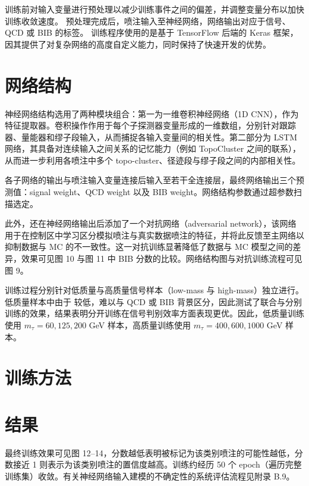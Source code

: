 训练前对输入变量进行预处理以减少训练事件之间的偏差，并调整变量分布以加快训练收敛速度。
预处理完成后，喷注输入至神经网络，网络输出对应于信号、QCD 或 BIB 的标签。
训练程序使用的是基于 TensorFlow 后端的 Keras 框架，因其提供了对复杂网络的高度自定义能力，同时保持了快速开发的优势。


\section{网络结构}
神经网络结构选用了两种模块组合：第一为一维卷积神经网络（1D CNN），作为特征提取器。卷积操作作用于每个子探测器变量形成的一维数组，分别针对跟踪器、量能器和缪子段输入，从而捕捉各输入变量间的相关性。第二部分为 LSTM 网络，其具备对连续输入之间关系的记忆能力（例如 TopoCluster 之间的联系），从而进一步利用各喷注中多个 topo-cluster、径迹段与缪子段之间的内部相关性。

各子网络的输出与喷注输入变量连接后输入至若干全连接层，最终网络输出三个预测值：signal weight、QCD weight 以及 BIB weight。网络结构参数通过超参数扫描选定。

此外，还在神经网络输出后添加了一个对抗网络（adversarial network），该网络用于在控制区中学习区分模拟喷注与真实数据喷注的特征，并将此反馈至主网络以抑制数据与 MC 的不一致性。这一对抗训练显著降低了数据与 MC 模型之间的差异，效果可见图 10 与图 11 中 BIB 分数的比较。网络结构图与对抗训练流程可见图 9。

训练过程分别针对低质量与高质量信号样本（low-mass 与 high-mass）独立进行。低质量样本中由于 \pt 较低，难以与 QCD 或 BIB 背景区分，因此测试了联合与分别训练的效果，结果表明分开训练在信号判别效率方面表现更优。因此，低质量训练使用 $m_\tau = 60, 125, 200$ GeV 样本，高质量训练使用 $m_\tau = 400, 600, 1000$ GeV 样本。


\section{训练方法}


\section{结果}
最终训练效果可见图 12--14，分数越低表明被标记为该类别喷注的可能性越低，分数接近 1 则表示为该类别喷注的置信度越高。训练约经历 50 个 epoch（遍历完整训练集）收敛。有关神经网络输入建模的不确定性的系统评估流程见附录 B.9。


